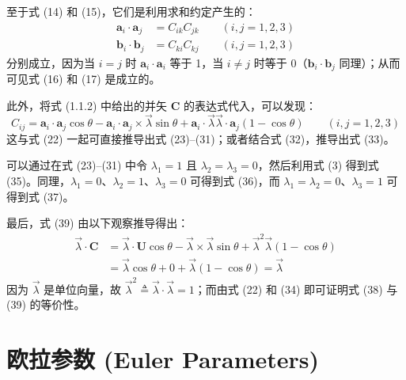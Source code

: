 至于式 (14) 和 (15)，它们是利用求和约定产生的：
\begin{align}
\mathbf{a}_i \cdot \mathbf{a}_j &= C_{ik} C_{jk} \qquad (i, j = 1, 2, 3) \tag{47} \\
\mathbf{b}_i \cdot \mathbf{b}_j &= C_{ki} C_{kj} \qquad (i, j = 1, 2, 3) \tag{48}
\end{align}
分别成立，因为当 \(i = j\) 时 \(\mathbf{a}_i \cdot \mathbf{a}_i\) 等于 1，当 \(i \neq j\) 时等于 0（\(\mathbf{b}_i \cdot \mathbf{b}_j\) 同理）；从而可见式 (16) 和 (17) 是成立的。

此外，将式 (1.1.2) 中给出的并矢 \(\mathbf{C}\) 的表达式代入，可以发现：
\begin{equation}
C_{ij} = \mathbf{a}_i \cdot \mathbf{a}_j \cos\theta - \mathbf{a}_i \cdot \mathbf{a}_j \times \vec{\lambda} \sin\theta + \mathbf{a}_i \cdot \vec{\lambda}\vec{\lambda} \cdot \mathbf{a}_j(1-\cos\theta) \qquad (i, j = 1, 2, 3) \tag{58}
\end{equation}
这与式 (22) 一起可直接推导出式 (23)--(31)；或者结合式 (32)，推导出式 (33)。

可以通过在式 (23)--(31) 中令 \(\lambda_1 = 1\) 且 \(\lambda_2 = \lambda_3 = 0\)，然后利用式 (3) 得到式 (35)。同理，\(\lambda_1 = 0\)、\(\lambda_2 = 1\)、\(\lambda_3 = 0\) 可得到式 (36)，而 \(\lambda_1 = \lambda_2 = 0\)、\(\lambda_3 = 1\) 可得到式 (37)。

最后，式 (39) 由以下观察推导得出：
\begin{align}
\vec{\lambda} \cdot \mathbf{C} &= \vec{\lambda} \cdot \mathbf{U} \cos\theta - \vec{\lambda} \times \vec{\lambda} \sin\theta + \vec{\lambda}^2 \vec{\lambda} (1-\cos\theta) \nonumber \\
&= \vec{\lambda} \cos\theta + 0 + \vec{\lambda} (1-\cos\theta) = \vec{\lambda} \tag{59}
\end{align}
因为 \(\vec{\lambda}\) 是单位向量，故 \(\vec{\lambda}^2 \triangleq \vec{\lambda} \cdot \vec{\lambda} = 1\)；而由式 (22) 和 (34) 即可证明式 (38) 与 (39) 的等价性。

\section{欧拉参数 (Euler Parameters)}

